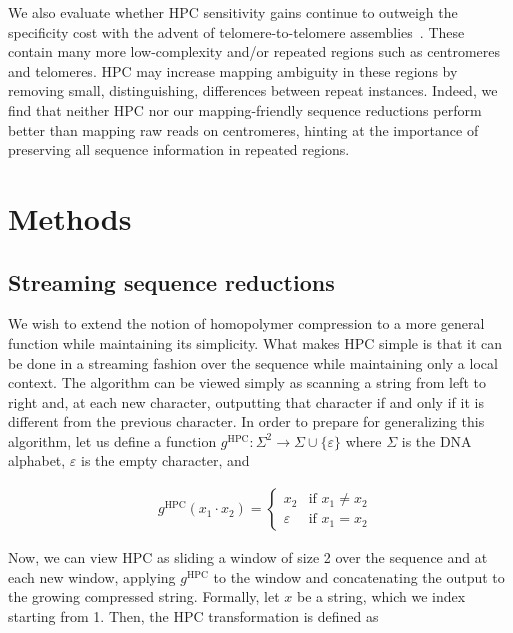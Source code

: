 \documentclass[
  11pt,
  twoside,
  BCOR=10mm,
  listof=totoc]{scrbook}
\begin{document}
We also evaluate whether HPC sensitivity gains continue to outweigh the specificity cost with the advent of telomere-to-telomere assemblies~\autocite{nurk2022}. These contain many more low-complexity and/or repeated regions such as centromeres and telomeres. HPC may increase mapping ambiguity in these regions by removing small, distinguishing, differences between repeat instances. Indeed, we find that neither HPC nor our mapping-friendly sequence reductions perform better than mapping raw reads on centromeres, hinting at the importance of preserving all sequence information in repeated regions.

\hypertarget{methods}{%
\section{Methods}\label{methods}}

\hypertarget{sec:msr-def}{%
\subsection{Streaming sequence reductions}\label{sec:msr-def}}

We wish to extend the notion of homopolymer compression to a more general function while maintaining its simplicity. What makes HPC simple is that it can be done in a streaming fashion over the sequence while maintaining only a local context. The algorithm can be viewed simply as scanning a string from left to right and, at each new character, outputting that character if and only if it is different from the previous character. In order to prepare for generalizing this algorithm, let us define a function \(g^\text{HPC} : \Sigma^2\rightarrow\Sigma\cup\{\varepsilon\}\) where \(\Sigma\) is the DNA alphabet, \(\varepsilon\) is the empty character, and

\begin{align*}
    & g^\text{HPC}(x_1\cdot x_2) =
    \begin{cases}
        x_2 & \text{if } x_1 \neq x_2 \\
        \varepsilon & \text{if } x_1 = x_2
    \end{cases}
\end{align*}

Now, we can view HPC as sliding a window of size 2 over the sequence and at each new window, applying \(g^\text{HPC}\) to the window and concatenating the output to the growing compressed string. Formally, let \(x\) be a string, which we index starting from 1. Then, the HPC transformation is defined as
\end{document}
